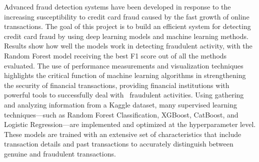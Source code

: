 Advanced fraud detection systems have been developed in response to the increasing susceptibility to credit card fraud caused by the fast growth of online transactions. The goal of this project is to build an efficient system for detecting credit card fraud by using deep learning models and machine learning methods. Results show how well the models work in detecting fraudulent activity, with the Random Forest model receiving the best F1 score out of all the methods evaluated. The use of performance measurements and visualization techniques highlights the critical function of machine learning algorithms in strengthening the security of financial transactions, providing financial institutions with powerful tools to successfully deal with  fraudulent activities. Using gathering and analyzing information from a Kaggle dataset, many supervised learning techniques—such as Random Forest Classification, XGBoost, CatBoost, and Logistic Regression—are implemented and optimized at the hyperparameter level. These models are trained with an extensive set of characteristics that include transaction details and past transactions to accurately distinguish between genuine and fraudulent transactions.

 






